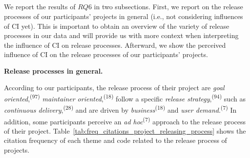 \subsection*{\textbf{\RQsix}}

We report the results of $RQ6$ in two subsections. First, we report on the release processes of our participants' projects in general (i.e., not considering influences of CI yet). This is important to obtain an overview of the variety of release processes in our data and will provide us with more context when interpreting the influence of CI on release processes. 
Afterward, we show the perceived influence of CI on the release processes of our participants' projects.

\vspace{2mm}
\noindent\textbf{Release processes in general.}
\vspace{2mm}

According to our participants, the release process of their project are \textit{goal oriented},\textsuperscript{(97)} \textit{maintainer oriented},\textsuperscript{(18)} follow a specific \textit{release strategy},\textsuperscript{(94)} such as \textit{continuous delivery},\textsuperscript{(28)} and are driven by \textit{business}\textsuperscript{(18)} and \textit{user demand}.\textsuperscript{(7)} In addition, some participants perceive an \textit{ad hoc}\textsuperscript{(7)} approach to the release process of their project. Table~\ref{tab:freq_citations_project_releasing_process} shows the citation frequency of each theme and code related to the release process of projects.

